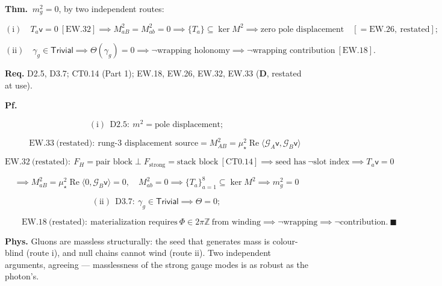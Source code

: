 \begin{theorem}\label{tag:CT3-14}
\textbf{Thm.} $\ m_g^2=0$, by two independent routes:

\[
(\mathrm{i})\quad T_a\mathsf v=0\ [\mathrm{EW.32}]\implies M^2_{aB}=M^2_{ab}=0\implies\{T_a\}\subseteq\ker M^2\implies\text{zero pole displacement}\quad[=\mathrm{EW.26},\ \text{restated}];
\]

\[
(\mathrm{ii})\quad\gamma_g\in\mathsf{Trivial}\implies\Theta(\gamma_g)=0\implies\neg\text{wrapping holonomy}\implies\neg\text{wrapping contribution}\ [\mathrm{EW.18}].
\]

\textbf{Req.} D2.5, D3.7; CT0.14 (Part 1); EW.18, EW.26, EW.32, EW.33 (\textbf{D}, restated at use).

\textbf{Pf.}

\[
(\mathrm{i})\ \ \mathrm{D2.5}:\ m^2=\text{pole displacement};
\]

\[
\qquad \mathrm{EW.33}\ \text{(restated)}:\ \text{rung-3 displacement source}=M^2_{AB}=\mu_\star^2\operatorname{Re}\langle\mathcal G_A\mathsf v,\mathcal G_B\mathsf v\rangle
\]

\[
\mathrm{EW.32}\ \text{(restated)}:\ F_H=\text{pair block}\perp F_{\mathrm{strong}}=\text{stack block}\ [\mathrm{CT0.14}]\implies\text{seed has}\ \neg\text{slot index}\implies T_a\mathsf v=0
\]

\[
\implies M^2_{aB}=\mu_\star^2\operatorname{Re}\langle0,\mathcal G_B\mathsf v\rangle=0,\quad M^2_{ab}=0\implies\{T_a\}_{a=1}^{8}\subseteq\ker M^2\implies m_g^2=0
\]

\[
(\mathrm{ii})\ \ \mathrm{D3.7}:\ \gamma_g\in\mathsf{Trivial}\implies\Theta=0;
\]

\[
\qquad \mathrm{EW.18}\ \text{(restated)}:\ \text{materialization requires}\ \Phi\in2\pi\mathbb Z\ \text{from winding}\implies\neg\text{wrapping}\implies\neg\text{contribution}.\ \blacksquare
\]

\textbf{Phys.} Gluons are massless structurally: the seed that generates mass is colour-blind (route i), and null chains cannot wind (route ii). Two independent arguments, agreeing — masslessness of the strong gauge modes is as robust as the photon’s.

\end{theorem}

